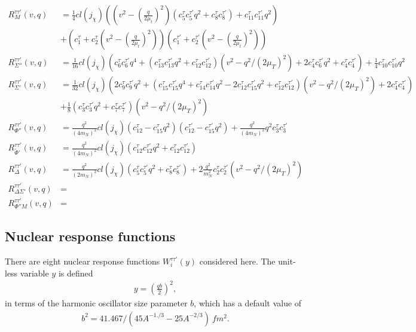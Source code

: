 \documentclass[11pt]{amsart}
\begin{document}
\begin{align}
R_{M}^{\tau\tau'}(v,q) &= 
\frac{1}{4}cl(j_\chi) \left(
	(v^2-(\frac{q}{2\mu_t})^2)(c_5^{\tau}c_5^{\tau'}q^2 + c_8^{\tau}c_8^{\tau'})
	+ c_{11}^{\tau}c_{11}^{\tau'}q^2
\right)\\
& + (c_1^{\tau} + c_2^{\tau}(v^2-(\frac{q}{2\mu_t})^2) )(c_1^{\tau'} + c_2^{\tau'}(v^2-(\frac{q}{2\mu_t})^2) )
\\
R_{\Sigma''}^{\tau\tau'}(v,q) &= 
\frac{1}{16}cl(j_\chi) \left(
	c_6^{\tau}c_6^{\tau'}q^4 + (c_{13}^{\tau}c_{13}^{\tau'}q^2 +c_{12}^{\tau} c_{12}^{\tau'} )
	(v^2-q^2/(2\mu_T)^2) + 2c_4^\tau c_6^{\tau'} q^2 + c_4^\tau c_4^{\tau '}
\right )
+ \frac{1}{4} c_{10}^\tau c_{10}^{\tau '} q^2
\\
R_{\Sigma'}^{\tau\tau'}(v,q) &= 
\frac{1}{32} cl(j_\chi) \left (
	2c_{9}^{\tau}c_{9}^{\tau'}q^2
	+ (
		c_{15}^{\tau}c_{15}^{\tau'}q^4
		+ c_{14}^{\tau}c_{14}^{\tau'}q^2
		-2 c_{12}^{\tau}c_{15}^{\tau'} q^2
		+c_{12}^{\tau}c_{12}^{\tau'}
	) (v^2-q^2/(2\mu_T)^2)
	+2 c_{4}^{\tau}c_{4}^{\tau'}
\right)\\
&+\frac{1}{8} \left(
	c_{3}^{\tau}c_3^{\tau'}q^2
	+ c_{7}^{\tau}c_{7}^{\tau'}
\right) (v^2-q^2/(2\mu_T)^2)
\\
R_{\Phi''}^{\tau\tau'}(v,q) &= 
\frac{q^2}{(4m_N)^2}cl(j_\chi) \left(
	c_{12}^\tau - c_{15}^{\tau} q^2
\right ) \left(
	c_{12}^{\tau '}-c_{15}^{\tau '}q^2
\right )
+ \frac{q^2}{(4m_N)^2}q^2c_3^\tau c_3^{\tau'}
\\
R_{\tilde{\Phi}'}^{\tau\tau'}(v,q) &= 
\frac{q^2}{(4m_N)^2}cl(j_\chi) \left(
	c_{12}^\tau c_{12}^{\tau'} q^2
	+ c_{12}^\tau c_{12}^{\tau'} 
\right)
\\
R_{\Delta}^{\tau\tau'}(v,q) &= 
\frac{q^2}{(2m_N)^2}cl(j_\chi) \left(
	c_{5}^{\tau}c_{5}^{\tau'}q^2
	+ c_{8}^{\tau}c_{8}^{\tau'}
\right)
+2\frac{q^2}{m_N^2} c_{2}^{\tau}c_{2}^{\tau'}
(v^2-q^2/(2\mu_T)^2)
\\
R_{\Delta \Sigma'}^{\tau\tau'}(v,q) &= 
\\
R_{\Phi''M}^{\tau\tau'}(v,q) &= 
\end{align}

\subsection{Nuclear response functions}
There are eight nuclear response functions $W_i^{\tau\tau'}(y)$ considered here. The unit-less variable $y$ is defined 
\begin{align}
 y = \left ( \frac{qb}{2} \right) ^2,
 \end{align}
 in terms of the harmonic oscillator size parameter $b$, which has a default value of 
 \begin{align}
b^2 = 41.467/(45A^{-1./3} - 25A^{-2/3})\ fm^2.
 \end{align}
\end{document}
